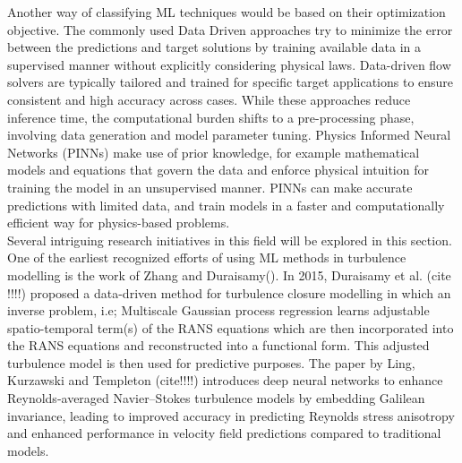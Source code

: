 Another way of classifying ML techniques would be based on their optimization objective. The commonly used Data Driven approaches try to minimize the error between the predictions and target solutions by training available data in a supervised manner without explicitly considering physical laws. Data-driven flow solvers are typically tailored and trained for specific target applications to ensure consistent and high accuracy across cases. While these approaches reduce inference time, the computational burden shifts to a pre-processing phase, involving data generation and model parameter tuning. Physics Informed Neural Networks (PINNs) make use of prior knowledge, for example mathematical models and equations that govern the data and enforce physical intuition for training the model in an unsupervised manner. PINNs can make accurate predictions with limited data, and train models in a faster and computationally efficient way for physics-based problems. \\
Several intriguing research initiatives in this field will be explored in this section. One of the earliest recognized efforts of using ML methods in turbulence modelling is the work of Zhang and Duraisamy(). In 2015, Duraisamy et al. (cite !!!!) proposed a data-driven method for turbulence closure modelling in which an inverse problem, i.e; Multiscale Gaussian process regression learns adjustable spatio-temporal term(s) of the RANS equations which are then incorporated into the RANS equations and reconstructed into a functional form. This adjusted turbulence model is then used for predictive purposes. The paper by Ling, Kurzawski and Templeton (cite!!!!) introduces deep neural networks to enhance Reynolds-averaged Navier–Stokes turbulence models by embedding Galilean invariance, leading to improved accuracy in predicting Reynolds stress anisotropy and enhanced performance in velocity field predictions compared to traditional models. \\
